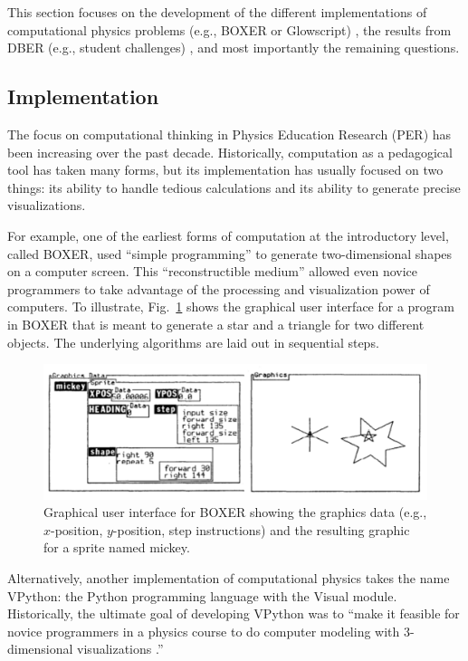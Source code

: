 \documentclass{msuphddissertation}
\begin{document}
\begin{doublespace}
This section focuses on the development of the different implementations of computational physics problems (e.g., BOXER or Glowscript) \cite{DiSessa1986,Redish1992,Chonacky2008,McIntyre2008}, the results from DBER (e.g., student challenges) \cite{Chabay2008,Buffler2008,Belloni2008,Hoover2008,Cook2008,Weiman2008}, and most importantly the remaining questions.

\subsection{Implementation}

The focus on computational thinking in Physics Education Research (PER) has been increasing over the past decade.  Historically, computation as a pedagogical tool has taken many forms, but its implementation has usually focused on two things: its ability to handle tedious calculations and its ability to generate precise visualizations.

For example, one of the earliest forms of computation at the introductory level, called BOXER, used ``simple programming'' to generate two-dimensional shapes on a computer screen.  This ``reconstructible medium'' allowed even novice programmers to take advantage of the processing and visualization power of computers.  To illustrate, Fig.~\ref{CH2:BOXER} shows the graphical user interface for a program in BOXER that is meant to generate a star and a triangle for two different objects.  The underlying algorithms are laid out in sequential steps.

\begin{figure}\center
\includegraphics[scale=0.75]{images/CH2BOXER.pdf}
\caption{Graphical user interface for BOXER showing the graphics data (e.g., $x$-position, $y$-position, step instructions) and the resulting graphic for a sprite named mickey.}\label{CH2:BOXER}
\end{figure}

Alternatively, another implementation of computational physics takes the name VPython: the Python programming language with the Visual module.  Historically, the ultimate goal of developing VPython was to ``make it feasible for novice programmers in a physics course to do computer modeling with 3-dimensional visualizations \cite{Sherer2000}.''


\end{doublespace}
\end{document}
